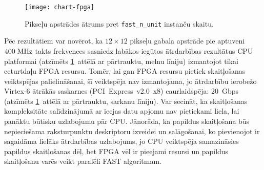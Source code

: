 \begin{figure}[tbh]
	\centering
	\texttt{[image: chart-fpga]}
	\caption{Pikseļu apstrādes ātrums pret \texttt{fast\_n\_unit} instanču skaitu.}
	\label{fig:test3-data}
\end{figure}

Pēc rezultātiem var novērot, ka $12 \times 12$ pikseļu gabala apstrāde pie
aptuveni $400\;\mathrm{MHz}$ takts frekvences sasniedz labākos iegūtos
ātrdarbības rezultātus CPU platformai
(atzīmēts \ref{fig:test3-data}~attēlā ar pārtrauktu, melnu līniju)
izmantojot tikai ceturtdaļu FPGA resursu. Tomēr, lai gan FPGA resursu pietiek
skaitļošanas veiktspējas palielināšanai, šī veiktspēja nav izmantojama, jo
ātrdarbību ierobežo Virtex-6 ātrākās saskarnes (PCI~Express~v2.0~x8)
caurlaidspēja: 20~Gbps (atzīmēts \ref{fig:test3-data}~attēlā ar pārtrauktu,
sarkanu līniju). Var secināt, ka skaitļošanas kompleksitāte salīdzinājumā
ar ieejas datu apjomu nav pietiekami liela, lai panāktu būtisku uzlabojumu
pār CPU. Jānorāda, ka papildus skaitļošana būs nepieciešama raksturpunktu
deskriptoru izveidei un salāgošanai, ko pievienojot ir sagaidāma lielāks
ātrdarbības uzlabojums, jo CPU veiktspēja samazināsies papildus skaitļošanas
dēļ, bet FPGA vēl ir pieejami resursi un papildus skaitļošanu varēs veikt
paralēli FAST algoritmam.
